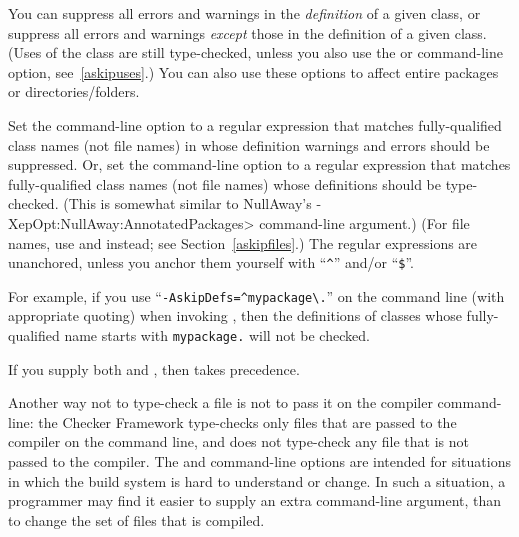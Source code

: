 


You can suppress all errors and warnings in the \emph{definition} of a given
class, or suppress all errors and warnings \emph{except} those in the definition
of a given class.  (Uses of the class are still type-checked, unless you also use
the  or  command-line option,
see~\ref{askipuses}.)
You can also use these options to affect entire packages or directories/folders.

Set the  command-line option to a
regular expression that matches fully-qualified class names (not file names) in whose definition warnings and errors
should be suppressed.
Or, set the  command-line option to a
regular expression that matches fully-qualified class names (not file names) whose
definitions should be type-checked.
(This is somewhat similar to NullAway's
\<-XepOpt:NullAway:AnnotatedPackages> command-line argument.)
(For file names, use  and  instead; see
Section~\ref{askipfiles}.)
The regular expressions are unanchored, unless you anchor them yourself
with ``\codesize\verb|^|'' and/or ``\codesize\verb|$|''.

For example, if you use
``{\codesize\verb|-AskipDefs=^mypackage\.|}'' on the command line
(with appropriate quoting) when invoking
, then the definitions of
classes whose fully-qualified name starts with \codesize\verb|mypackage.|
will not be checked.

If you supply both  and , then
 takes precedence.

Another way not to type-check a file is not to pass it on the compiler
command-line:  the Checker Framework type-checks only files that are passed
to the compiler on the command line, and does not type-check any file that
is not passed to the compiler.  The  and 
command-line options
are intended for situations in which the build system is hard to understand
or change.  In such a situation, a programmer may find it easier to supply
an extra command-line argument, than to change the set of files that is
compiled.

